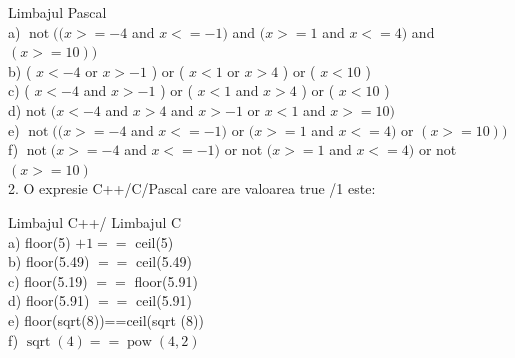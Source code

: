 \documentclass[10pt]{article}
\begin{document}
Limbajul Pascal\\
a) $\operatorname{not}((x>=-4$ and $x<=-1)$ and $(x>=1$ and $x<=4)$ and $(x>=10))$\\
b) ( $x<-4$ or $x>-1$ ) or ( $x<1$ or $x>4$ ) or ( $x<10$ )\\
c) ( $x<-4$ and $x>-1$ ) or ( $x<1$ and $x>4$ ) or ( $x<10$ )\\
d) not $(x<-4$ and $x>4$ and $x>-1$ or $x<1$ and $x>=10)$\\
e) $\operatorname{not}((x>=-4$ and $x<=-1)$ or $(x>=1$ and $x<=4)$ or $(x>=10))$\\
f) $\operatorname{not}(x>=-4$ and $x<=-1)$ or not $(x>=1$ and $x<=4)$ or not $(x>=10)$\\
2. O expresie C++/C/Pascal care are valoarea true /1 este:

Limbajul C++/ Limbajul C\\
a) floor(5) $+1==$ ceil(5)\\
b) floor(5.49) $==$ ceil(5.49)\\
c) floor(5.19) $==$ floor(5.91)\\
d) floor(5.91) $==$ ceil(5.91)\\
e) floor(sqrt(8))==ceil(sqrt (8))\\
f) $\operatorname{sqrt}(4)==\operatorname{pow}(4,2)$
\end{document}

